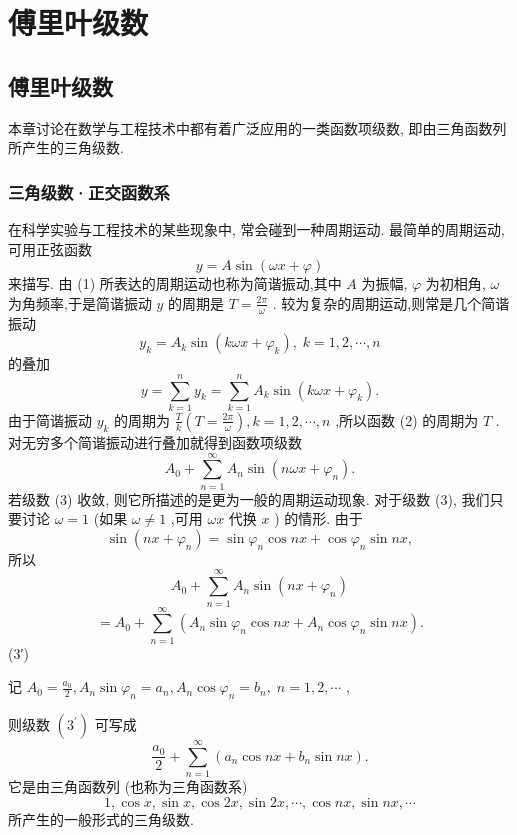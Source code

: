 \chapter{傅里叶级数}

\section{傅里叶级数}

本章讨论在数学与工程技术中都有着广泛应用的一类函数项级数, 即由三角函数列所产生的三角级数.

\subsection{三角级数·正交函数系}

在科学实验与工程技术的某些现象中, 常会碰到一种周期运动. 最简单的周期运动, 可用正弦函数
\[
y = A\sin \left( {{\omega x} + \varphi }\right)  \tag{1}
\]
来描写. 由 (1) 所表达的周期运动也称为简谐振动,其中 \(A\) 为振幅, \(\varphi\) 为初相角, \(\omega\) 为角频率,于是简谐振动 \(y\) 的周期是 \(T = \frac{2\pi }{\omega }\) . 较为复杂的周期运动,则常是几个简谐振动
\[
{y}_{k} = {A}_{k}\sin \left( {{k\omega x} + {\varphi }_{k}}\right) ,\;k = 1,2,\cdots ,n
\]
的叠加
\[
y = \mathop{\sum }\limits_{{k = 1}}^{n}{y}_{k} = \mathop{\sum }\limits_{{k = 1}}^{n}{A}_{k}\sin \left( {{k\omega x} + {\varphi }_{k}}\right) . \tag{2}
\]
由于简谐振动 \({y}_{k}\) 的周期为 \(\frac{T}{k}\left( {T = \frac{2\pi }{\omega }}\right) ,k = 1,2,\cdots ,n\) ,所以函数 (2) 的周期为 \(T\) . 对无穷多个简谐振动进行叠加就得到函数项级数
\[
{A}_{0} + \mathop{\sum }\limits_{{n = 1}}^{\infty }{A}_{n}\sin \left( {{n\omega x} + {\varphi }_{n}}\right) . \tag{3}
\]
若级数 (3) 收敛, 则它所描述的是更为一般的周期运动现象. 对于级数 (3), 我们只要讨论 \(\omega  = 1\) (如果 \(\omega  \neq  1\) ,可用 \({\omega x}\) 代换 \(x\) ) 的情形. 由于
\[
\sin \left( {{nx} + {\varphi }_{n}}\right)  = \sin {\varphi }_{n}\cos {nx} + \cos {\varphi }_{n}\sin {nx},
\]
所以
\[
{A}_{0} + \mathop{\sum }\limits_{{n = 1}}^{\infty }{A}_{n}\sin \left( {{nx} + {\varphi }_{n}}\right)
\]
\[
= {A}_{0} + \mathop{\sum }\limits_{{n = 1}}^{\infty }\left( {{A}_{n}\sin {\varphi }_{n}\cos {nx} + {A}_{n}\cos {\varphi }_{n}\sin {nx}}\right) .
\]
 (3′)

记 \({A}_{0} = \frac{{a}_{0}}{2},{A}_{n}\sin {\varphi }_{n} = {a}_{n},{A}_{n}\cos {\varphi }_{n} = {b}_{n},\;n = 1,2,\cdots\) ,

则级数 \(\left( {3}^{\prime }\right)\) 可写成
\[
\frac{{a}_{0}}{2} + \mathop{\sum }\limits_{{n = 1}}^{\infty }\left( {{a}_{n}\cos {nx} + {b}_{n}\sin {nx}}\right) . \tag{4}
\]
它是由三角函数列 (也称为三角函数系)
\[
1,\cos x,\sin x,\cos {2x},\sin {2x},\cdots ,\cos {nx},\sin {nx},\cdots  \tag{5}
\]
所产生的一般形式的三角级数.

